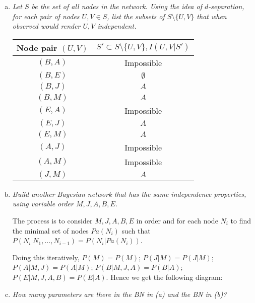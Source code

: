 \documentclass{article}
\begin{document}
\begin{enumerate}[(a)]
\item \textit{Let $S$ be the set of all nodes in the network. Using
  the idea of $d$-separation, for each pair of nodes $U,V\in S$, list
  the subsets of $S\setminus \{U,V\}$ that when observed would render
  $U,V$ independent.}

  \begin{tabular}{|c|c|}
  \hline
  Node pair $(U,V)$ & $S'\subset S\setminus \{U,V\},I(U,V|S')$ \\
  \hline
  $(B, A)$ & Impossible \\
  $(B, E)$ & $\emptyset$ \\
  $(B, J)$ & $A$ \\
  $(B, M)$ & $A$ \\
  $(E, A)$ & Impossible \\
  $(E, J)$ & $A$ \\
  $(E, M)$ & $A$ \\
  $(A, J)$ & Impossible \\
  $(A, M)$ & Impossible \\
  $(J, M)$ & $A$ \\
  \hline
  \end{tabular}

\item \textit{Build another Bayesian network that has the same
  independence properties, using variable order $M,J,A,B,E$.}

  The process is to consider $M,J,A,B,E$ in order and for each node
  $N_i$ to find the minimal set of nodes $Pa(N_i)$ such that
  $P(N_i|N_1,\ldots,N_{i-1})=P(N_i|Pa(N_i))$.

  Doing this iteratively, $P(M)=P(M)$; $P(J|M)=P(J|M)$;
  $P(A|M,J)=P(A|M)$; $P(B|M,J,A)=P(B|A)$; $P(E|M,J,A,B)=P(E|A)$. Hence
  we get the following diagram:

\begin{center}
\end{center}
\item \textit{How many parameters are there in the BN in (a) and the
  BN in (b)?}


\end{enumerate}
\end{document}
